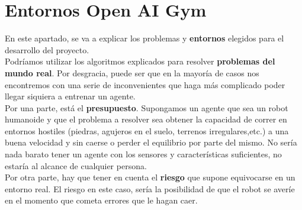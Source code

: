 \documentclass[11pt,fleqn]{book} %
\begin{document}
%
%
%

\chapter{Entornos Open AI Gym}\label{sec:entornos}

En este apartado, se va a explicar los problemas y \textbf{entornos} elegidos para el desarrollo del proyecto. \\

Podríamos utilizar los algoritmos explicados para resolver \textbf{problemas del mundo real}. Por desgracia, puede ser que en la mayoría de casos nos encontremos con una serie de inconvenientes que haga más complicado poder llegar siquiera a entrenar un agente. \\

Por una parte, está el \textbf{presupuesto}. Supongamos un agente que sea un robot humanoide y que el problema a resolver sea obtener la capacidad de correr en entornos hostiles (piedras, agujeros en el suelo, terrenos irregulares,etc.) a una buena velocidad y sin caerse o perder el equilibrio por parte del mismo. No sería nada barato tener un agente con los sensores y características suficientes, no estaría al alcance de cualquier persona. \\

Por otra parte, hay que tener en cuenta el \textbf{riesgo} que supone equivocarse en un entorno real. El riesgo en este caso, sería la posibilidad de que el robot se averíe en el momento que cometa errores que le hagan caer. \\
\end{document}
